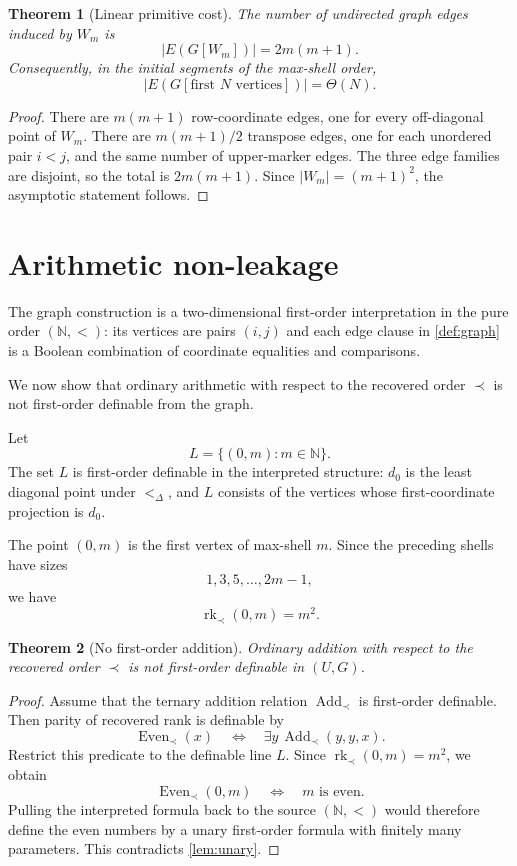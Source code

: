 \documentclass[11pt]{article}
\newtheorem{theorem}{Theorem}[section]
\theoremstyle{definition}
\newcommand{\N}{\mathbb N}
\newcommand{\rk}{\operatorname{rk}}
\begin{document}
\begin{theorem}[Linear primitive cost]\label{thm:linear}
The number of undirected graph edges induced by $W_m$ is
\[
|E(G[W_m])|=2m(m+1).
\]
Consequently, in the initial segments of the max-shell order,
\[
|E(G[\text{first }N\text{ vertices}])|=\Theta(N).
\]
\end{theorem}

\begin{proof}
There are $m(m+1)$ row-coordinate edges, one for every off-diagonal point of $W_m$.  There are $m(m+1)/2$ transpose edges, one for each unordered pair $i<j$, and the same number of upper-marker edges.  The three edge families are disjoint, so the total is $2m(m+1)$.  Since $|W_m|=(m+1)^2$, the asymptotic statement follows.
\end{proof}

\section{Arithmetic non-leakage}

The graph construction is a two-dimensional first-order interpretation in the pure order $(\N,<)$: its vertices are pairs $(i,j)$ and each edge clause in \cref{def:graph} is a Boolean combination of coordinate equalities and comparisons.

We now show that ordinary arithmetic with respect to the recovered order $\prec$ is not first-order definable from the graph.

Let
\[
L=\{(0,m):m\in\N\}.
\]
The set $L$ is first-order definable in the interpreted structure: $d_0$ is the least diagonal point under $<_{\Delta}$, and $L$ consists of the vertices whose first-coordinate projection is $d_0$.

The point $(0,m)$ is the first vertex of max-shell $m$.  Since the preceding shells have sizes
\[
1,3,5,\ldots,2m-1,
\]
we have
\[
\rk_{\prec}(0,m)=m^2.
\]

\begin{theorem}[No first-order addition]\label{thm:noadd}
Ordinary addition with respect to the recovered order $\prec$ is not first-order definable in $(U,G)$.
\end{theorem}

\begin{proof}
Assume that the ternary addition relation $\operatorname{Add}_{\prec}$ is first-order definable.  Then parity of recovered rank is definable by
\[
\operatorname{Even}_{\prec}(x)
\quad\Longleftrightarrow\quad
\exists y\,\operatorname{Add}_{\prec}(y,y,x).
\]
Restrict this predicate to the definable line $L$.  Since $\rk_{\prec}(0,m)=m^2$, we obtain
\[
\operatorname{Even}_{\prec}(0,m)
\quad\Longleftrightarrow\quad
m\text{ is even}.
\]
Pulling the interpreted formula back to the source $(\N,<)$ would therefore define the even numbers by a unary first-order formula with finitely many parameters.  This contradicts \cref{lem:unary}.
\end{proof}
\end{document}
